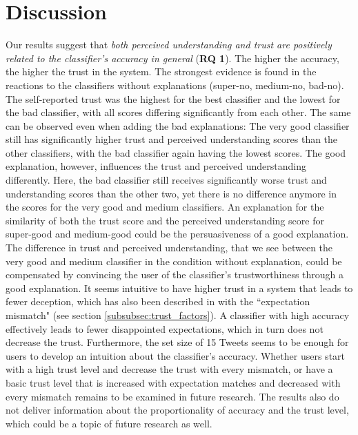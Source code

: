
















\section{Discussion}
Our results suggest that \textit{both perceived understanding and trust are positively related to the classifier's accuracy in general} (\textbf{RQ 1}). The higher the accuracy, the higher the trust in the system. The strongest evidence is found in the reactions to the classifiers without explanations (super-no, medium-no, bad-no). The self-reported trust was the highest for the best classifier and the lowest for the bad classifier, with all scores differing significantly from each other. The same can be observed even when adding the bad explanations: The very good classifier still has significantly higher trust and perceived understanding scores than the other classifiers, with the bad classifier again having the lowest scores. The good explanation, however, influences the trust and perceived understanding differently. Here, the bad classifier still receives significantly worse trust and understanding scores than the other two, yet there is no difference anymore in the scores for the very good and medium classifiers. \newline
An explanation for the similarity of both the trust score and the perceived understanding score for super-good and medium-good could be the persuasiveness of a good explanation. The difference in trust and perceived understanding, that we see between the very good and medium classifier in the condition without explanation, could be compensated by convincing the user of the classifier's trustworthiness through a good explanation.\newline
It seems intuitive to have higher trust in a system that leads to fewer deception, which has also been described in \cite{glass2008toward} with the ``expectation mismatch" (see section \ref{subsubsec:trust_factors}). A classifier with high accuracy effectively leads to fewer disappointed expectations, which in turn does not decrease the trust. Furthermore, the set size of 15 Tweets seems to be enough for users to develop an intuition about the classifier's accuracy. Whether users start with a high trust level and decrease the trust with every mismatch, or have a basic trust level that is increased with expectation matches and decreased with every mismatch remains to be examined in future research. The results also do not deliver information about the proportionality of accuracy and the trust level, which could be a topic of future research as well. \medskip \newline
